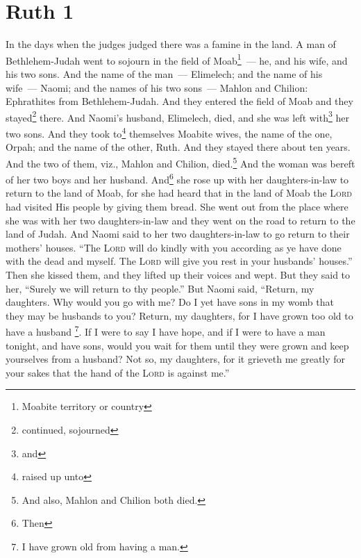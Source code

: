 \section{Ruth 1}\label{Ruth 1}
\begin{enumerate}
     In the days when the judges judged there was a famine in the land. A man of Bethlehem-Judah went to sojourn in the field of Moab\footnote{Moabite territory or country}~--- he, and his wife, and his two sons.%
     And the name of the man~--- Elimelech; and the name of his wife~--- Naomi; and the names of his two sons~--- Mahlon and Chilion: Ephrathites from Bethlehem-Judah. And they entered the field of Moab and they stayed\footnote{continued, sojourned} there.%
     And Naomi's husband, Elimelech, died, and she was left with\footnote{and} her two sons.%
     And they took to\footnote{raised up unto} themselves Moabite wives, the name of the one, Orpah; and the name of the other, Ruth. And they stayed there about ten years.%
     And the two of them, viz., Mahlon and Chilion, died.\footnote{ And also, Mahlon and Chilion both died.} And the woman was bereft of her two boys and her husband.%
     And\footnote{Then} she rose up with her daughters-in-law to return to the land of Moab, for she had heard that in the land of Moab the \textsc{Lord} had visited His people by giving them bread.%
     She went out from the place where she was with her two daughters-in-law and they went on the road to return to the land of Judah.%
     And Naomi said to her two daughters-in-law to go return to their mothers' houses. ``The \textsc{Lord} will do kindly with you according as ye have done with the dead and myself.%
     The \textsc{Lord} will give you rest in your husbands' houses.'' Then she kissed them, and they lifted up their voices and wept.%
     But they said to her, ``Surely we will return to thy people.''%
     But Naomi said, ``Return, my daughters. Why would you go with me? Do I yet have sons in my womb that they may be husbands to you?%
     Return, my daughters, for I have grown too old to have a husband \footnote{I have grown old from having a man.}. If I were to say I have hope, and if I were to have a man tonight, and have sons,%
     would you wait for them until they were grown and keep yourselves from a husband? Not so, my daughters, for it grieveth me greatly for your sakes that the hand of the \textsc{Lord} is against me.''%

\end{enumerate}
